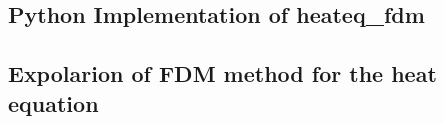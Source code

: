 \subsection{Python Implementation of heateq\_fdm}
\label{app:heateq_fdm}



\subsection{Expolarion of FDM method for the heat equation}
\label{app:convergence_of_heateq_fdm}

